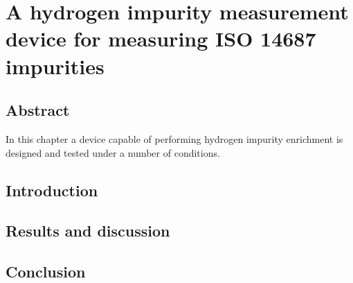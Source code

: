 \chapter{A hydrogen impurity measurement device for measuring ISO 14687 impurities}

\section{Abstract}
In this chapter a device capable of performing hydrogen impurity enrichment is designed and tested under a number of conditions.

\section{Introduction}

\section{Results and discussion}

\section{Conclusion}
% 
% 